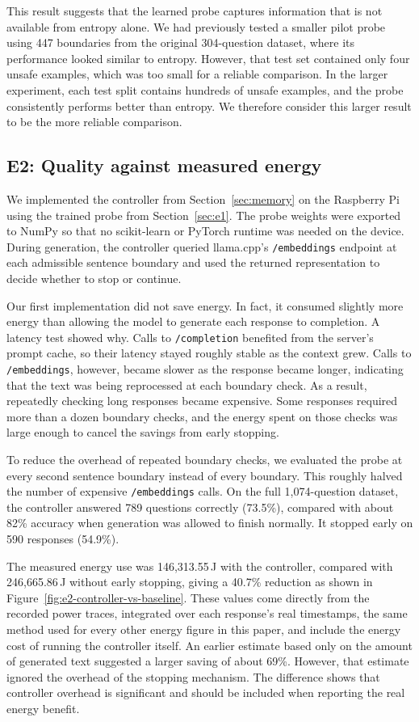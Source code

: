 \documentclass[review,12pt]{elsarticle}
\begin{document}
This result suggests that the learned probe captures information that is not
available from entropy alone. We had previously tested a smaller pilot probe
using 447 boundaries from the original 304-question dataset, where its
performance looked similar to entropy. However, that test set contained only
four unsafe examples, which was too small for a reliable comparison. In the larger experiment, each test split contains hundreds of unsafe
examples, and the probe consistently performs better than entropy. We
therefore consider this larger result to be the more reliable comparison.

\subsection{E2: Quality against measured energy}
\label{sec:e2}
We implemented the controller from Section~\ref{sec:memory} on the
Raspberry Pi using the trained probe from Section~\ref{sec:e1}. The probe
weights were exported to NumPy so that no scikit-learn or PyTorch runtime was
needed on the device. During generation, the controller queried llama.cpp's
\texttt{/embeddings} endpoint at each admissible sentence boundary and used
the returned representation to decide whether to stop or continue.

Our first implementation did not save energy. In fact, it consumed slightly
more energy than allowing the model to generate each response to completion.
A latency test showed why. Calls to \texttt{/completion} benefited from the
server's prompt cache, so their latency stayed roughly stable as the context
grew. Calls to \texttt{/embeddings}, however, became slower as the response
became longer, indicating that the text was being reprocessed at each
boundary check. As a result, repeatedly checking long responses became expensive. Some
responses required more than a dozen boundary checks, and the energy spent on
those checks was large enough to cancel the savings from early stopping.

To reduce the overhead of repeated boundary checks, we evaluated the probe
at every second sentence boundary instead of every boundary. This roughly
halved the number of expensive \texttt{/embeddings} calls. On the full 1{,}074-question dataset, the controller answered 789 questions correctly (73.5\%), compared with about 82\% accuracy when generation was
allowed to finish normally. It stopped early on 590 responses (54.9\%). 

The measured energy use was 146{,}313.55\,J with the controller, compared
with 246{,}665.86\,J without early stopping, giving a 40.7\% reduction
as shown in Figure~\ref{fig:e2-controller-vs-baseline}. These values come directly
from the recorded power traces, integrated over each response's real
timestamps, the same method used for every other energy figure in this
paper, and include the energy cost of running the controller itself. An earlier estimate based only on the amount of generated text suggested
a larger saving of about 69\%. However, that estimate ignored the overhead
of the stopping mechanism. The difference shows that controller overhead
is significant and should be included when reporting the real energy
benefit.
\end{document}
